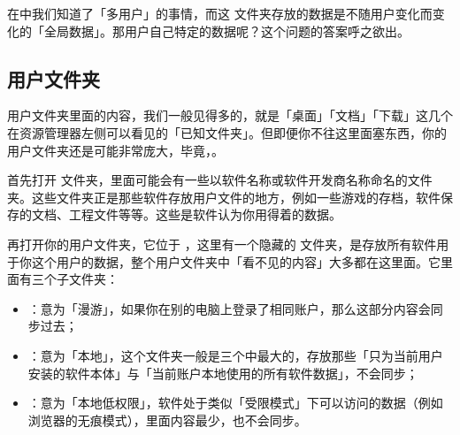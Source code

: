 在中我们知道了「多用户」的事情，而这  文件夹存放的数据是不随用户变化而变化的「全局数据」。那用户自己特定的数据呢？这个问题的答案呼之欲出。

\subsection{用户文件夹}

用户文件夹里面的内容，我们一般见得多的，就是「桌面」「文档」「下载」这几个在资源管理器左侧可以看见的「已知文件夹」。但即便你不往这里面塞东西，你的用户文件夹还是可能非常庞大，毕竟，。

首先打开  文件夹，里面可能会有一些以软件名称或软件开发商名称命名的文件夹。这些文件夹正是那些软件存放用户文件的地方，例如一些游戏的存档，软件保存的文档、工程文件等等。这些是软件认为你用得着的数据。

再打开你的用户文件夹，它位于 ，这里有一个隐藏的  文件夹，是存放所有软件用于你这个用户的数据，整个用户文件夹中「看不见的内容」大多都在这里面。它里面有三个子文件夹：
\begin{itemize}
  \item {}：意为「漫游」，如果你在别的电脑上登录了相同账户，那么这部分内容会同步过去；
  \item {}：意为「本地」，这个文件夹一般是三个中最大的，存放那些「只为当前用户安装的软件本体」与「当前账户本地使用的所有软件数据」，不会同步；
  \item {}：意为「本地低权限」，软件处于类似「受限模式」下可以访问的数据（例如浏览器的无痕模式），里面内容最少，也不会同步。
\end{itemize}

